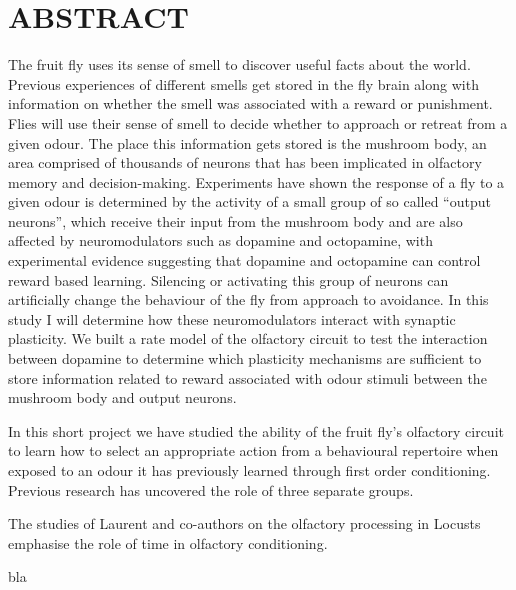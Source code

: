\section{ABSTRACT}


The fruit fly uses its sense of smell to discover useful facts about the world. \iffalse Strange odours are populating the world everywhere, every being tries to smell it as the molecules propagate without end \fi  Previous experiences of different smells get stored in
the fly brain along with information on whether the smell was associated
with a reward or punishment. \iffalse Reward or punishment, as if this is the be all end all of everything. It's not we don't think in binary, things don't exist in only two states above the scale of quanta. \fi Flies will use their sense of smell to
decide whether to approach or retreat from a given odour. The place
this information gets stored is the mushroom body, an area comprised
of thousands of neurons that has been implicated in olfactory memory
and decision-making. Experiments have shown the response of a fly
to a given odour is determined by the activity of a small group of
so called \textquotedblleft output neurons\textquotedblright , which
receive their input from the mushroom body and are also affected by
neuromodulators such as dopamine and octopamine, with experimental
evidence suggesting that dopamine and octopamine can control reward
based learning. Silencing or activating this group of neurons can
artificially change the behaviour of the fly from approach to avoidance.
In this study I will determine how these neuromodulators interact
with synaptic plasticity. We built a rate model of the olfactory circuit to test the interaction between dopamine to determine which plasticity mechanisms are sufficient to store information related to reward associated with odour stimuli between the mushroom body and output neurons.

In this short project we have studied the ability of the fruit fly's olfactory circuit to learn how to select an appropriate action from a behavioural repertoire when exposed to an odour it has previously learned through first order conditioning. Previous research has uncovered the role of three separate groups. 

The studies of Laurent and co-authors on the olfactory processing in Locusts \cite{22278062} emphasise the role of time in olfactory conditioning. 
  
  
  
  
  
  
  
  
bla \cite{25864636}  
  